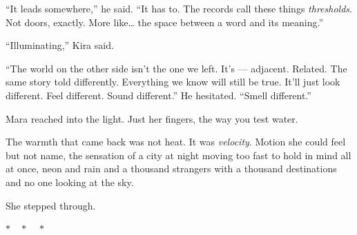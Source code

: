 ``It leads somewhere,'' he said. ``It has to. The records call
these things \emph{thresholds}. Not doors, exactly. More
like\ldots{} the space between a word and its meaning.''

``Illuminating,'' Kira said.

``The world on the other side isn't the one we left. It's ---
adjacent. Related. The same story told differently. Everything we
know will still be true. It'll just look different. Feel different.
Sound different.'' He hesitated. ``Smell different.''

Mara reached into the light. Just her fingers, the way you test
water.

The warmth that came back was not heat. It was \emph{velocity}.
Motion she could feel but not name, the sensation of a city at
night moving too fast to hold in mind all at once, neon and
rain and a thousand strangers with a thousand destinations and no
one looking at the sky.

She stepped through.


\lipsum[5][1-4]

\medskip

\lipsum[6]

\lipsum[7]

\lipsum[8][1-5]


\lipsum[9]

\lipsum[10][1-3]

\bigskip
\begin{center}
{\hdfont\small\color{atrRule}$\ast\quad\ast\quad\ast$}
\end{center}
